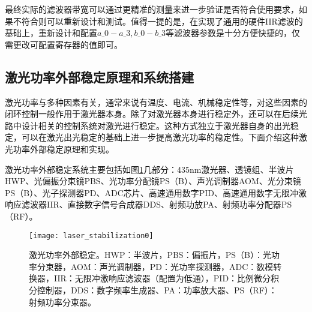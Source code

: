 最终实际的滤波器带宽可以通过更精准的测量来进一步验证是否符合使用要求，如果不符合则可以重新设计和测试。值得一提的是，在实现了通用的硬件IIR滤波的基础上，重新设计和配置$a\_0-a\_3, b\_0-b\_3$等滤波器参数是十分方便快捷的，仅需更改可配置寄存器的值即可。




\subsection[激光功率外部稳定原理和系统搭建]{激光功率外部稳定原理和系统搭建}
激光功率与多种因素有关，通常来说有温度、电流、机械稳定性等，对这些因素的闭环控制一般作用于激光器本身。除了对激光器本身进行稳定外，还可以在后续光路中设计相关的控制系统对激光进行稳定。这种方式独立于激光器自身的出光稳定，可以在激光出光稳定的基础上进一步提高激光功率的稳定性。下面介绍这种激光功率外部稳定原理和实现。



激光功率外部稳定系统主要包括如图\ref{fig:laser_stabilization0}几部分：435nm激光器、透镜组、半波片HWP、光偏振分束镜PBS、光功率分配镜PS（B）、声光调制器AOM、光分束镜PS（B）、光子探测器PD、ADC芯片、高速通用数字PID、高速通用数字无限冲激响应滤波器IIR、直接数字信号合成器DDS、射频功放PA、射频功率分配器PS（RF）。

\begin{figure}
    \centering
    \texttt{[image: laser\_stabilization0]}
    \caption[激光功率外部稳定]{激光功率外部稳定。HWP：半波片，PBS：偏振片，PS（B）：光功率分束器，AOM：声光调制器，PD：光功率探测器，ADC：数模转换器，IIR：无限冲激响应滤波器（配置为低通），PID：比例微分积分控制器，DDS：数字频率生成器、PA：功率放大器、PS（RF）：射频功率分束器。\label{fig:laser_stabilization0}}
\end{figure}

